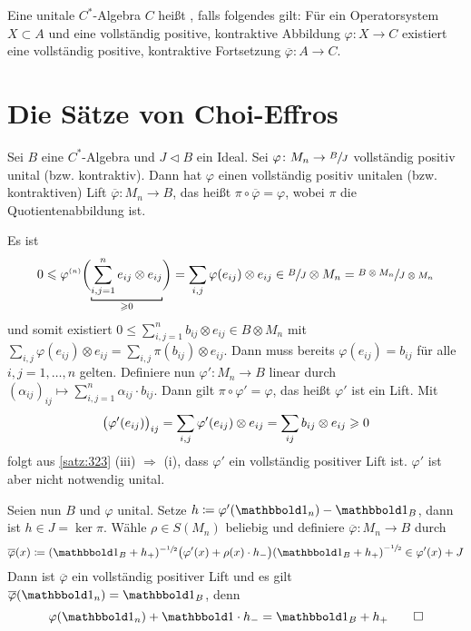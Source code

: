 \begin{definition}[{name=[injektive C*-Algebra]}]
	Eine unitale $C^*$-Algebra $C$ heißt , falls folgendes gilt:
	Für ein Operatorsystem $X \subset A$ und eine vollständig positive, kontraktive Abbildung $\varphi \colon X \to C$ existiert eine vollständig positive, kontraktive Fortsetzung $\overline{\varphi} \colon A \to C$.
\end{definition}
\newpage

\section{Die Sätze von Choi-Effros} %
\label{sec:4}


\begin{proposition}[label=prop:41]
	Sei $B$ eine $C^*$-Algebra und $J \lhd B$ ein Ideal.
	Sei $\varphi \colon M_n \to \sfrac{B}{J}$ vollständig positiv  unital (bzw. kontraktiv).
	Dann hat $\varphi$ einen vollständig positiv unitalen (bzw. kontraktiven) Lift $\overline{\varphi} \colon M_n \to B$, das heißt $\pi \circ \overline{\varphi} = \varphi$, wobei $\pi$ die Quotientenabbildung ist.
\end{proposition}
\begin{beweis}
	Es ist 
	\[
		0 \le \varphi^\ssbrace{n}\enbrace[\bigg]{\Underbracket{\sum_{i,j=1}^{n} e_{ij} \otimes e_{ij}}{\ge 0}} = \sum_{i,j} \varphi(e_{ij}) \otimes e_{ij} \in \sfrac{B}{J} \otimes M_n = \sfrac{B \otimes M_n}{J \otimes M_n}
	\]
	und somit existiert $0 \le \sum_{i,j=1}^{n} b_{ij} \otimes e_{ij} \in B \otimes M_n$ mit $\sum_{i,j} \varphi(e_{ij}) \otimes e_{ij} = \sum_{i,j} \pi(b_{ij}) \otimes e_{ij}$.
	Dann muss bereits $\varphi(e_{ij})=b_{ij}$ für alle $i,j=1,\ldots,n$ gelten.
	Definiere nun $\varphi' \colon M_n \to B$ linear durch $(\alpha_{ij})_{ij} \mapsto \sum_{i,j=1}^{n} \alpha_{ij} \cdot b_{ij}$.
	Dann gilt $\pi \circ \varphi' = \varphi$, das heißt $\varphi'$ ist ein Lift.
	Mit 
	\[
		\enbrace[\big]{\varphi'(e_{ij})}_{ij} = \sum_{i,j} \varphi'(e_{ij}) \otimes e_{ij} = \sum_{ij} b_{ij} \otimes e_{ij} \ge 0
	\]
	folgt aus \autoref{satz:323} (iii) $\Rightarrow$ (i), dass $\varphi'$ ein vollständig positiver Lift ist.
	$\varphi'$ ist aber nicht notwendig unital.
	
	Seien nun $B$ und $\varphi$ unital.
	Setze $h \coloneqq \varphi' (\ind_n) - \ind_B$, dann ist $h \in J = \ker \pi$.
	Wähle $\rho \in S(M_n)$ beliebig und definiere $\overline{\varphi} \colon M_n \to B$ durch
	\[
		\overline{\varphi}(x) \coloneqq (\ind_B + h_+)^{-\sfrac{1}{2}}\enbrace[\big]{\varphi'(x)+ \rho(x) \cdot h_-} \enbrace*{\ind_B + h_+}^{-\sfrac{1}{2}} \in \varphi'(x) + J
	\]
	Dann ist $\overline{\varphi}$ ein vollständig positiver Lift und es gilt $\overline{\varphi}(\ind_n) = \ind_B$, denn
	\[
		\varphi(\ind_n) + \ind \cdot h_- = \ind_B + h_+ \qedhere
	\]
\end{beweis}

